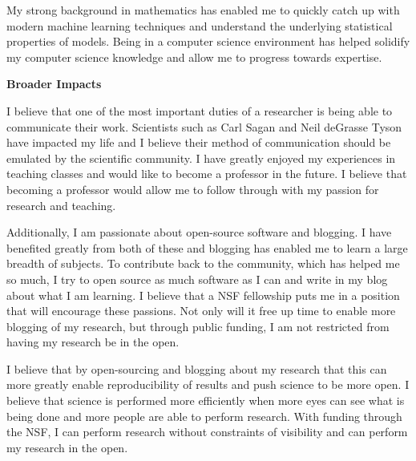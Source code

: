 \documentclass[12pt]{article}
\begin{document}
My strong background in mathematics has enabled me to quickly catch up with
modern machine learning techniques and understand the underlying statistical
properties of models. Being in a computer science environment has helped
solidify my computer science knowledge and allow me to progress towards
expertise. 

\textbf{Broader Impacts}
%

I believe that one of the most important duties of a researcher is being able to
communicate their work. Scientists such as Carl Sagan and Neil deGrasse Tyson
have impacted my life and I believe their method of communication should be
emulated by the scientific community. I have greatly enjoyed my experiences in
teaching classes and would like to become a professor in the future. I believe
that becoming a professor would allow me to follow through with my passion for
research and teaching. 

Additionally, I am passionate about open-source software and blogging.
I have benefited greatly from both of these and blogging has enabled
me to learn a large breadth of subjects. To contribute back to the
community, which has helped me so much, I try to open source as much software as
I can and write in my blog about what I am learning. I believe that a NSF
fellowship puts me in a position that will encourage these passions. Not only
will it free up time to enable more blogging of my research, but through 
public funding, I am not restricted from having my research be in the open.

I believe that by open-sourcing and blogging about my research that this can
more greatly enable reproducibility of results and push science to be more open.
I believe that science is performed more efficiently when more eyes can 
see what is being done and more people are able to perform research.
With funding through the NSF, I can perform research without constraints
of visibility and can perform my research in the open.

%
\end{document}
